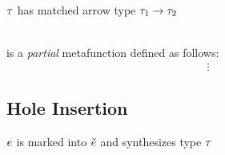 \documentclass{article}
\begin{document}
 $\TMV$ has matched arrow type
$\TArrow{\TMV_1}{\TMV_2}$
%
\begin{mathpar}

\end{mathpar} \\

 is a \emph{partial} metafunction defined as
follows:
%
\newcommand{\joinsTo}[3]{\ensuremath{\TJoin{#1}{#2} & = & #3}}
\[\begin{array}{rcl}
  & \vdots &
\end{array}\]

\subsection{Hole Insertion}
\judgbox{\ctxSynFixedInto{\ctx}{\EMV}{\ECMV}{\TMV}} $\EMV$ is marked into $\ECMV$ and
synthesizes type $\TMV$
%
\end{document}
